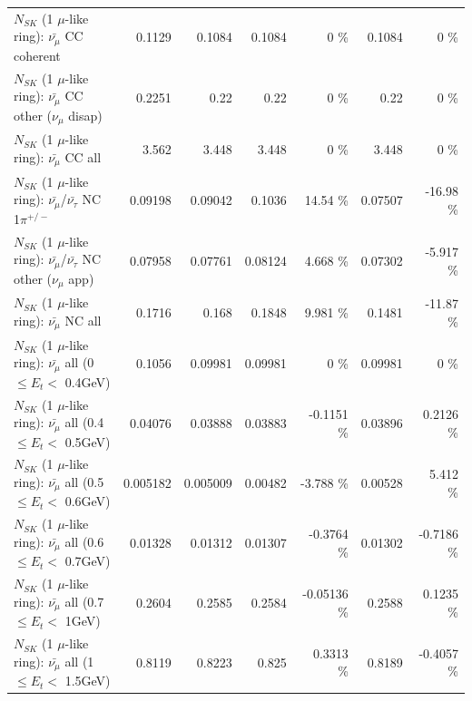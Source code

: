 \begin{table}
\begin{tabular}{| l | r | r | r  r | r  r |}
                       $N_{SK}$ (1 $\mu$-like ring): $\bar{\nu_\mu}$ CC coherent &          0.1129 &          0.1084 &          0.1084 &        0 \%  &          0.1084 &        0 \%  \\ 
        $N_{SK}$ (1 $\mu$-like ring): $\bar{\nu_\mu}$ CC other ($\nu_\mu$ disap) &          0.2251 &            0.22 &            0.22 &        0 \%  &            0.22 &        0 \%  \\ 
                          $N_{SK}$ (1 $\mu$-like ring): $\bar{\nu_{\mu}}$ CC all &           3.562 &           3.448 &           3.448 &        0 \%  &           3.448 &        0 \%  \\ 
\hline
  $N_{SK}$ (1 $\mu$-like ring): $\bar{\nu_\mu}$/$\bar{\nu_\tau}$ NC 1$\pi^{+/-}$ &         0.09198 &         0.09042 &          0.1036 &    14.54 \%  &         0.07507 &   -16.98 \%  \\ 
$N_{SK}$ (1 $\mu$-like ring): $\bar{\nu_\mu}$/$\bar{\nu_\tau}$ NC other ($\nu_\mu$ app) &         0.07958 &         0.07761 &         0.08124 &    4.668 \%  &         0.07302 &   -5.917 \%  \\ 
                          $N_{SK}$ (1 $\mu$-like ring): $\bar{\nu_{\mu}}$ NC all &          0.1716 &           0.168 &          0.1848 &    9.981 \%  &          0.1481 &   -11.87 \%  \\ 
\hline
   $N_{SK}$ (1 $\mu$-like ring): $\bar{\nu_{\mu}}$ all (0 $\leq E_{t} <$ 0.4GeV) &          0.1056 &         0.09981 &         0.09981 &        0 \%  &         0.09981 &        0 \%  \\ 
 $N_{SK}$ (1 $\mu$-like ring): $\bar{\nu_{\mu}}$ all (0.4 $\leq E_{t} <$ 0.5GeV) &         0.04076 &         0.03888 &         0.03883 &  -0.1151 \%  &         0.03896 &   0.2126 \%  \\ 
 $N_{SK}$ (1 $\mu$-like ring): $\bar{\nu_{\mu}}$ all (0.5 $\leq E_{t} <$ 0.6GeV) &        0.005182 &        0.005009 &         0.00482 &   -3.788 \%  &         0.00528 &    5.412 \%  \\ 
 $N_{SK}$ (1 $\mu$-like ring): $\bar{\nu_{\mu}}$ all (0.6 $\leq E_{t} <$ 0.7GeV) &         0.01328 &         0.01312 &         0.01307 &  -0.3764 \%  &         0.01302 &  -0.7186 \%  \\ 
   $N_{SK}$ (1 $\mu$-like ring): $\bar{\nu_{\mu}}$ all (0.7 $\leq E_{t} <$ 1GeV) &          0.2604 &          0.2585 &          0.2584 & -0.05136 \%  &          0.2588 &   0.1235 \%  \\ 
   $N_{SK}$ (1 $\mu$-like ring): $\bar{\nu_{\mu}}$ all (1 $\leq E_{t} <$ 1.5GeV) &          0.8119 &          0.8223 &           0.825 &   0.3313 \%  &          0.8189 &  -0.4057 \%  \\ 

\end{tabular}
\end{table}
